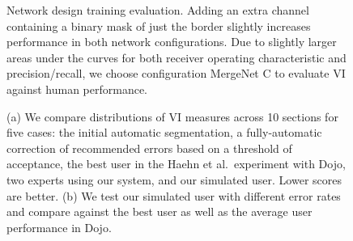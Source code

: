 \begin{figure}[ht]
 \caption{Network design training evaluation. Adding an extra channel containing a binary mask of just the border slightly increases performance in both network configurations. Due to slightly larger areas under the curves for both receiver operating characteristic and precision/recall, we choose configuration MergeNet C to evaluate VI against human performance.}
 \label{fig:trainingperformance}
\end{figure}


\begin{figure}[t]
 \centering
    \hfill

\caption{(a) We compare distributions of VI measures across 10 sections for five cases: the initial automatic segmentation, a fully-automatic correction of recommended errors based on a threshold of acceptance, the best user in the Haehn et al.~experiment with Dojo, two experts using our system, and our simulated user. Lower scores are better. (b) We test our simulated user with different error rates and compare against the best user as well as the average user performance in Dojo.}
\label{fig:results}

\end{figure}


